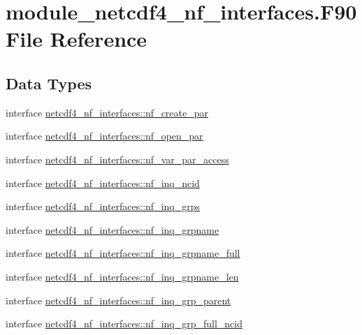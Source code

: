 \hypertarget{module__netcdf4__nf__interfaces_8F90}{}\section{module\+\_\+netcdf4\+\_\+nf\+\_\+interfaces.\+F90 File Reference}
\label{module__netcdf4__nf__interfaces_8F90}
\subsection*{Data Types}
\begin{DoxyCompactItemize}
\item 
interface \hyperlink{interfacenetcdf4__nf__interfaces_1_1nf__create__par}{netcdf4\+\_\+nf\+\_\+interfaces\+::nf\+\_\+create\+\_\+par}
\item 
interface \hyperlink{interfacenetcdf4__nf__interfaces_1_1nf__open__par}{netcdf4\+\_\+nf\+\_\+interfaces\+::nf\+\_\+open\+\_\+par}
\item 
interface \hyperlink{interfacenetcdf4__nf__interfaces_1_1nf__var__par__access}{netcdf4\+\_\+nf\+\_\+interfaces\+::nf\+\_\+var\+\_\+par\+\_\+access}
\item 
interface \hyperlink{interfacenetcdf4__nf__interfaces_1_1nf__inq__ncid}{netcdf4\+\_\+nf\+\_\+interfaces\+::nf\+\_\+inq\+\_\+ncid}
\item 
interface \hyperlink{interfacenetcdf4__nf__interfaces_1_1nf__inq__grps}{netcdf4\+\_\+nf\+\_\+interfaces\+::nf\+\_\+inq\+\_\+grps}
\item 
interface \hyperlink{interfacenetcdf4__nf__interfaces_1_1nf__inq__grpname}{netcdf4\+\_\+nf\+\_\+interfaces\+::nf\+\_\+inq\+\_\+grpname}
\item 
interface \hyperlink{interfacenetcdf4__nf__interfaces_1_1nf__inq__grpname__full}{netcdf4\+\_\+nf\+\_\+interfaces\+::nf\+\_\+inq\+\_\+grpname\+\_\+full}
\item 
interface \hyperlink{interfacenetcdf4__nf__interfaces_1_1nf__inq__grpname__len}{netcdf4\+\_\+nf\+\_\+interfaces\+::nf\+\_\+inq\+\_\+grpname\+\_\+len}
\item 
interface \hyperlink{interfacenetcdf4__nf__interfaces_1_1nf__inq__grp__parent}{netcdf4\+\_\+nf\+\_\+interfaces\+::nf\+\_\+inq\+\_\+grp\+\_\+parent}
\item 
interface \hyperlink{interfacenetcdf4__nf__interfaces_1_1nf__inq__grp__full__ncid}{netcdf4\+\_\+nf\+\_\+interfaces\+::nf\+\_\+inq\+\_\+grp\+\_\+full\+\_\+ncid}
\item 

\end{DoxyCompactItemize}

